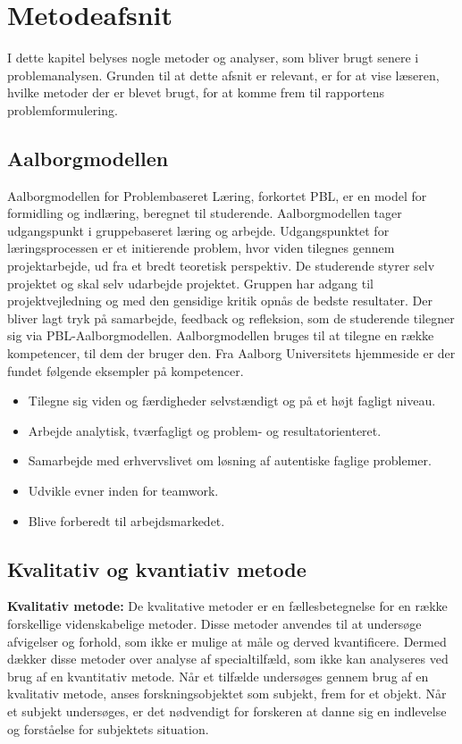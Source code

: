 \chapter{Metodeafsnit}
I dette kapitel belyses nogle metoder og analyser, som bliver brugt senere i problemanalysen. Grunden til at dette afsnit er relevant, er for at vise læseren, hvilke metoder der er blevet brugt, for at komme frem til rapportens problemformulering.

\section{Aalborgmodellen}
Aalborgmodellen for Problembaseret Læring, forkortet PBL, er en model for formidling og indlæring, beregnet til studerende. Aalborgmodellen tager udgangspunkt i gruppebaseret læring og arbejde. Udgangspunktet for læringsprocessen er et initierende problem, hvor viden tilegnes gennem projektarbejde, ud fra et bredt teoretisk perspektiv. De studerende styrer selv projektet og skal selv udarbejde projektet. Gruppen har adgang til projektvejledning og med den gensidige kritik opnås de bedste resultater. Der bliver lagt tryk på samarbejde, feedback og refleksion, som de studerende tilegner sig via PBL-Aalborgmodellen.
Aalborgmodellen bruges til at tilegne en række kompetencer, til dem der bruger den. Fra Aalborg Universitets hjemmeside er der fundet følgende eksempler på kompetencer.\citep{Universitet2015, Universitet2011}
\begin{itemize}
\setlength\itemsep{0.5em}
\item {Tilegne sig viden og færdigheder selvstændigt og på et højt fagligt niveau.}
\item {Arbejde analytisk, tværfagligt og problem- og resultatorienteret.}
\item {Samarbejde med erhvervslivet om løsning af autentiske faglige problemer.}
\item {Udvikle evner inden for teamwork.}
\item {Blive forberedt til arbejdsmarkedet.}
\end{itemize}

\section{Kvalitativ og kvantiativ metode}
\textbf{Kvalitativ metode:}
De kvalitative metoder er en fællesbetegnelse for en række forskellige videnskabelige metoder. Disse metoder anvendes til at undersøge afvigelser og forhold, som ikke er mulige at måle og derved kvantificere. Dermed dækker disse metoder over analyse af specialtilfæld, som ikke kan analyseres ved brug af en kvantitativ metode. Når et tilfælde undersøges gennem brug af en kvalitativ metode, anses forskningsobjektet som subjekt, frem for et objekt. Når et subjekt undersøges, er det nødvendigt for forskeren at danne sig en indlevelse og forståelse for subjektets situation.\citep{Kval, Gymportalen}\\

